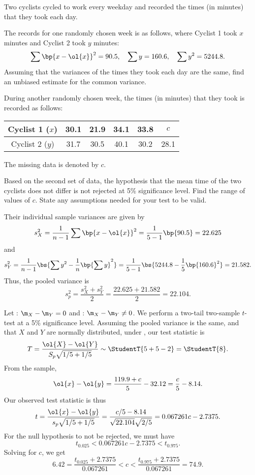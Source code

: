 \begin{problem}
    Two cyclists cycled to work every weekday and recorded the times (in minutes) that they took each day.
    
    The records for one randomly chosen week is as follows, where Cyclist 1 took $x$ minutes and Cyclist 2 took $y$ minutes: \[\sum \bp{x - \ol{x}}^2 = 90.5, \quad \sum y = 160.6, \quad \sum y^2 = 5244.8.\] Assuming that the variances of the times they took each day are the same, find an unbiased estimate for the common variance.

    During another randomly chosen week, the times (in minutes) that they took is recorded as follows: 
    \begin{table}[H]
        \centering
        \begin{tabular}{|c|c|c|c|c|c|}
        \hline
        Cyclist 1 ($x$) & 30.1 & 21.9 & 34.1 & 33.8 & $c$ \\ \hline
        Cyclist 2 ($y$) & 31.7 & 30.5 & 40.1 & 30.2 & 28.1 \\ \hline
        \end{tabular}
    \end{table}
    The missing data is denoted by $c$.

    Based on the second set of data, the hypothesis that the mean time of the two cyclists does not differ is not rejected at 5\% significance level. Find the range of values of $c$. State any assumptions needed for your test to be valid.
\end{problem}
\begin{solution}
    Their individual sample variances are given by \[s_X^2 = \frac1{n - 1} \sum \bp{x - \ol{x}}^2 = \frac1{5 - 1} \bp{90.5} = 22.625\] and \[s_Y^2 = \frac1{n - 1} \bs{\sum y^2 - \frac1{n} \bp{\sum y}^2} = \frac1{5 - 1} \bs{5244.8 - \frac15 \bp{160.6}^2} = 21.582.\] Thus, the pooled variance is \[s_p^2 = \frac{s_X^2 + s_Y^2}{2} = \frac{22.625 + 21.582}{2} = 22.104.\]

    Let \nullhyp: $\m_X - \m_Y = 0$ and \althyp: $\m_X - \m_Y \neq 0$. We perform a two-tail two-sample $t$-test at a 5\% significance level. Assuming the pooled variance is the same, and that $X$ and $Y$ are normally distributed, under \nullhyp, our test statistic is \[T = \frac{\ol{X} - \ol{Y}}{S_p \sqrt{1/5 + 1/5}} \sim \StudentT{5 + 5 - 2} = \StudentT{8}.\] From the sample, \[\ol{x} - \ol{y} = \frac{119.9 + c}{5} - 32.12 = \frac{c}{5} - 8.14.\] Our observed test statistic is thus \[t = \frac{\ol{x} - \ol{y}}{s_p \sqrt{1/5 + 1/5}} = \frac{c/5 - 8.14}{\sqrt{22.104} \sqrt{2/5}} = 0.067261 c - 2.7375.\] For the null hypothesis to not be rejected, we must have \[t_{0.025} < 0.067261 c - 2.7375 < t_{0.975}.\] Solving for $c$, we get \[6.42 = \frac{t_{0.025} + 2.7375}{0.067261} < c < \frac{t_{0.975} + 2.7375}{0.067261} = 74.9.\]
\end{solution}


